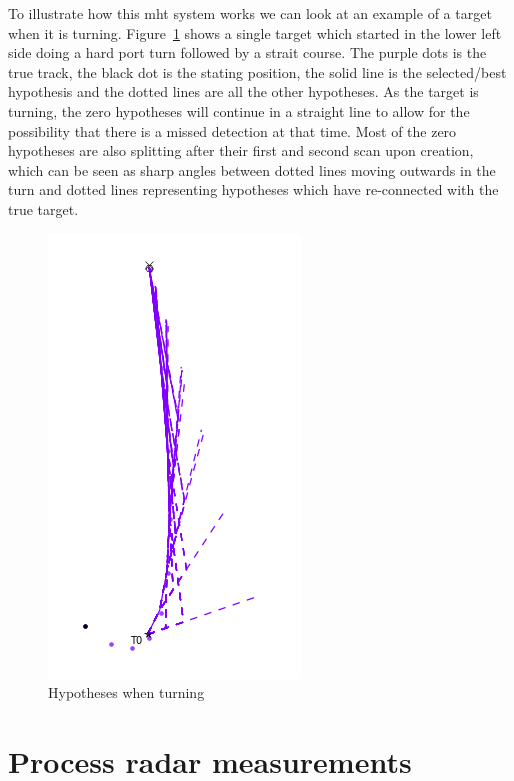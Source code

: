 To illustrate how this \gls{mht} system works we can look at an example of a target when it is turning. Figure~\ref{fig:hypotheses_when_turning} shows a single target which started in the lower left side doing a hard port turn followed by a strait course. The purple dots is the true track, the black dot is the stating position, the solid line is the selected/best hypothesis and the dotted lines are all the other hypotheses. As the target is turning, the zero hypotheses will continue in a straight line to allow for the possibility that there is a missed detection at that time. Most of the zero hypotheses are also splitting after their first and second scan upon creation, which can be seen as sharp angles between dotted lines moving outwards in the turn and dotted lines representing hypotheses which have re-connected with the true target.
\begin{figure}[H]
\centering
\includegraphics[height = .5\textheight]{Figures/Hypotheses_when_turning.PNG}
\caption{Hypotheses when turning}\label{fig:hypotheses_when_turning}
\end{figure}

\section{Process radar measurements}
